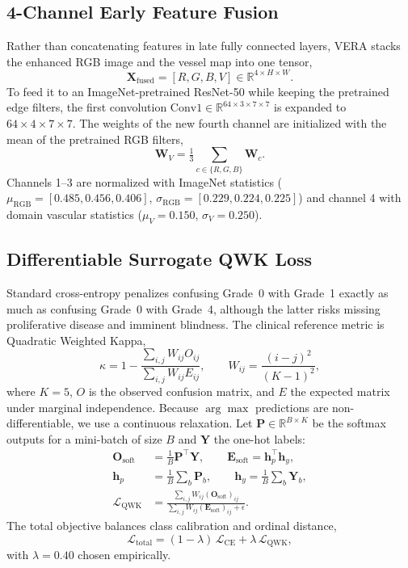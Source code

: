 \documentclass[conference]{IEEEtran}
\newcommand{\qwk}{\mathcal{L}_{\mathrm{QWK}}}
\begin{document}
\subsection{4-Channel Early Feature Fusion}
Rather than concatenating features in late fully connected layers, VERA stacks the enhanced RGB image and the vessel map into one tensor,
\begin{equation}
\mathbf{X}_{\mathrm{fused}}=[R,G,B,V]\in\mathbb{R}^{4\times H\times W}.
\end{equation}
To feed it to an ImageNet-pretrained ResNet-50 while keeping the pretrained edge filters, the first convolution $\mathrm{Conv1}\in\mathbb{R}^{64\times3\times7\times7}$ is expanded to $64\times4\times7\times7$. The weights of the new fourth channel are initialized with the mean of the pretrained RGB filters,
\begin{equation}
\mathbf{W}_V=\tfrac{1}{3}\sum_{c\in\{R,G,B\}}\mathbf{W}_c .
\end{equation}
Channels 1--3 are normalized with ImageNet statistics ($\mu_{\mathrm{RGB}}=[0.485,0.456,0.406]$, $\sigma_{\mathrm{RGB}}=[0.229,0.224,0.225]$) and channel 4 with domain vascular statistics ($\mu_V=0.150$, $\sigma_V=0.250$).

\subsection{Differentiable Surrogate QWK Loss}
Standard cross-entropy penalizes confusing Grade~0 with Grade~1 exactly as much as confusing Grade~0 with Grade~4, although the latter risks missing proliferative disease and imminent blindness. The clinical reference metric is Quadratic Weighted Kappa,
\begin{equation}
\kappa=1-\frac{\sum_{i,j}W_{ij}O_{ij}}{\sum_{i,j}W_{ij}E_{ij}},\qquad W_{ij}=\frac{(i-j)^2}{(K-1)^2},
\end{equation}
where $K=5$, $O$ is the observed confusion matrix, and $E$ the expected matrix under marginal independence. Because $\arg\max$ predictions are non-differentiable, we use a continuous relaxation. Let $\mathbf{P}\in\mathbb{R}^{B\times K}$ be the softmax outputs for a mini-batch of size $B$ and $\mathbf{Y}$ the one-hot labels:
\begin{align}
\mathbf{O}_{\mathrm{soft}}&=\tfrac{1}{B}\mathbf{P}^{\top}\mathbf{Y},\qquad
\mathbf{E}_{\mathrm{soft}}=\mathbf{h}_p^{\top}\mathbf{h}_y,\\
\mathbf{h}_p&=\tfrac{1}{B}\textstyle\sum_{b}\mathbf{P}_b,\qquad
\mathbf{h}_y=\tfrac{1}{B}\textstyle\sum_{b}\mathbf{Y}_b,\\
\qwk&=\frac{\sum_{i,j}W_{ij}(\mathbf{O}_{\mathrm{soft}})_{ij}}{\sum_{i,j}W_{ij}(\mathbf{E}_{\mathrm{soft}})_{ij}+\epsilon}.
\end{align}
The total objective balances class calibration and ordinal distance,
\begin{equation}
\mathcal{L}_{\mathrm{total}}=(1-\lambda)\,\mathcal{L}_{\mathrm{CE}}+\lambda\,\qwk,
\label{eq:total}
\end{equation}
with $\lambda=0.40$ chosen empirically.
\end{document}
